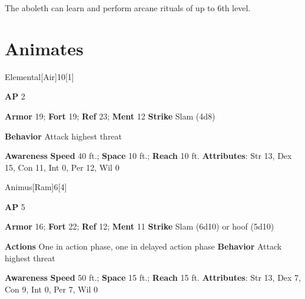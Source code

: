 The aboleth can learn and perform arcane rituals of up to 6th level.

\section{Animates}
\begin{monsection}{Elemental}[Air]{10}[1]
\vspace{-1em}\vspace{-1em}
\begin{spellcontent}
\begin{spelltargetinginfo}
{\textbf{AP} 2}

\pari \textbf{Armor} 19;
\textbf{Fort} 19;
\textbf{Ref} 23;
\textbf{Ment} 12
\pari \textbf{Strike} Slam  (4d8)



\pari \textbf{Behavior} Attack highest threat
\end{spelltargetinginfo}
\end{spellcontent}

\begin{monsterfooter}
\pari \textbf{Awareness} 
\pari \textbf{Speed} 40 ft.;
\textbf{Space} 10 ft.;
\textbf{Reach} 10 ft.
\pari \textbf{Attributes}:
Str 13,
Dex 15,
Con 11,
Int 0,
Per 12,
Wil 0
\end{monsterfooter}
\end{monsection}

\begin{monsection}{Animus}[Ram]{6}[4]
\vspace{-1em}\vspace{-1em}
\begin{spellcontent}
\begin{spelltargetinginfo}
{\textbf{AP} 5}

\pari \textbf{Armor} 16;
\textbf{Fort} 22;
\textbf{Ref} 12;
\textbf{Ment} 11
\pari \textbf{Strike} Slam  (6d10) or hoof  (5d10)


\pari \textbf{Actions} One in action phase, one in delayed action phase
\pari \textbf{Behavior} Attack highest threat
\end{spelltargetinginfo}
\end{spellcontent}

\begin{monsterfooter}
\pari \textbf{Awareness} 
\pari \textbf{Speed} 50 ft.;
\textbf{Space} 15 ft.;
\textbf{Reach} 15 ft.
\pari \textbf{Attributes}:
Str 13,
Dex 7,
Con 9,
Int 0,
Per 7,
Wil 0
\end{monsterfooter}
\end{monsection}


